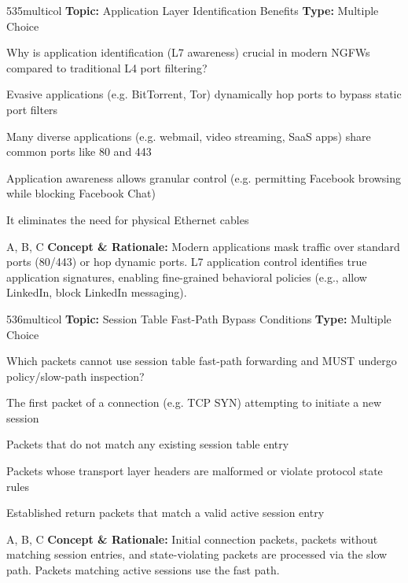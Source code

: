 \begin{qcard}{535}{multicol}
\textcolor{darkslate!75}{\small\textbf{Topic:} Application Layer Identification Benefits \hfill \textbf{Type:} Multiple Choice}\vspace{0.4em}\par
Why is application identification (L7 awareness) crucial in modern NGFWs compared to traditional L4 port filtering?
\begin{qoptions}
\item Evasive applications (e.g. BitTorrent, Tor) dynamically hop ports to bypass static port filters
\item Many diverse applications (e.g. webmail, video streaming, SaaS apps) share common ports like 80 and 443
\item Application awareness allows granular control (e.g. permitting Facebook browsing while blocking Facebook Chat)
\item It eliminates the need for physical Ethernet cables
\end{qoptions}
\end{qcard}
\nopagebreak
\begin{explainbox}{A, B, C}
\textbf{Concept \& Rationale:} Modern applications mask traffic over standard ports (80/443) or hop dynamic ports. L7 application control identifies true application signatures, enabling fine-grained behavioral policies (e.g., allow LinkedIn, block LinkedIn messaging).
\end{explainbox}

\begin{qcard}{536}{multicol}
\textcolor{darkslate!75}{\small\textbf{Topic:} Session Table Fast-Path Bypass Conditions \hfill \textbf{Type:} Multiple Choice}\vspace{0.4em}\par
Which packets cannot use session table fast-path forwarding and MUST undergo policy/slow-path inspection?
\begin{qoptions}
\item The first packet of a connection (e.g. TCP SYN) attempting to initiate a new session
\item Packets that do not match any existing session table entry
\item Packets whose transport layer headers are malformed or violate protocol state rules
\item Established return packets that match a valid active session entry
\end{qoptions}
\end{qcard}
\nopagebreak
\begin{explainbox}{A, B, C}
\textbf{Concept \& Rationale:} Initial connection packets, packets without matching session entries, and state-violating packets are processed via the slow path. Packets matching active sessions use the fast path.
\end{explainbox}


